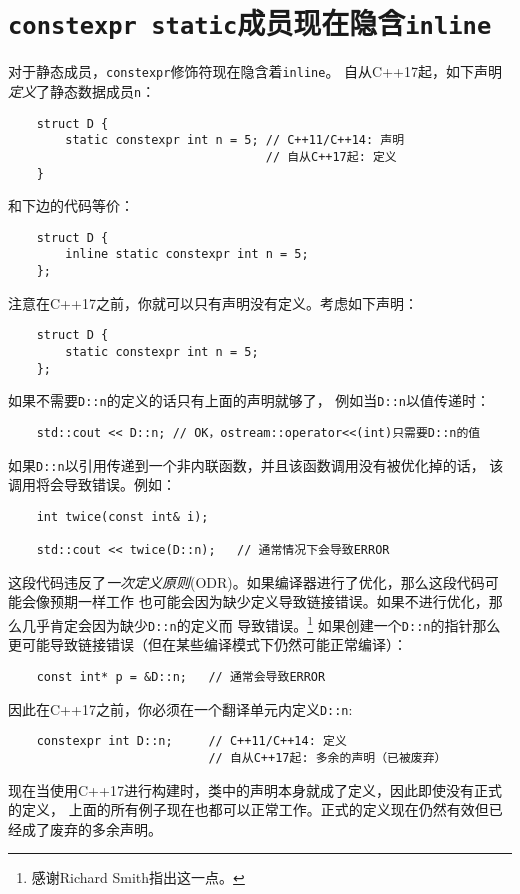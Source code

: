 \section{\texttt{constexpr static}成员现在隐含\texttt{inline}}\label{ch3.3}
对于静态成员，\texttt{constexpr}修饰符现在隐含着\texttt{inline}。
自从C++17起，如下声明\emph{定义}了静态数据成员\texttt{n}：
\begin{lstlisting}
    struct D {
        static constexpr int n = 5; // C++11/C++14: 声明
                                    // 自从C++17起: 定义
    }
\end{lstlisting}
和下边的代码等价：
\begin{lstlisting}
    struct D {
        inline static constexpr int n = 5;
    };
\end{lstlisting}
注意在C++17之前，你就可以只有声明没有定义。考虑如下声明：
\begin{lstlisting}
    struct D {
        static constexpr int n = 5;
    };
\end{lstlisting}
如果不需要\texttt{D::n}的定义的话只有上面的声明就够了，
例如当\texttt{D::n}以值传递时：
\begin{lstlisting}
    std::cout << D::n; // OK，ostream::operator<<(int)只需要D::n的值
\end{lstlisting}
如果\texttt{D::n}以引用传递到一个非内联函数，并且该函数调用没有被优化掉的话，
该调用将会导致错误。例如：
\begin{lstlisting}
    int twice(const int& i);

    std::cout << twice(D::n);   // 通常情况下会导致ERROR
\end{lstlisting}
这段代码违反了\emph{一次定义原则}(ODR)。如果编译器进行了优化，那么这段代码可能会像预期一样工作
也可能会因为缺少定义导致链接错误。如果不进行优化，那么几乎肯定会因为缺少\texttt{D::n}的定义而
导致错误。\footnote{感谢Richard Smith指出这一点。}
如果创建一个\texttt{D::n}的指针那么更可能导致链接错误（但在某些编译模式下仍然可能正常编译）：
\begin{lstlisting}
    const int* p = &D::n;   // 通常会导致ERROR
\end{lstlisting}
因此在C++17之前，你必须在一个翻译单元内定义\texttt{D::n}:
\begin{lstlisting}
    constexpr int D::n;     // C++11/C++14: 定义
                            // 自从C++17起: 多余的声明（已被废弃）
\end{lstlisting}
现在当使用C++17进行构建时，类中的声明本身就成了定义，因此即使没有正式的定义，
上面的所有例子现在也都可以正常工作。正式的定义现在仍然有效但已经成了废弃的多余声明。

